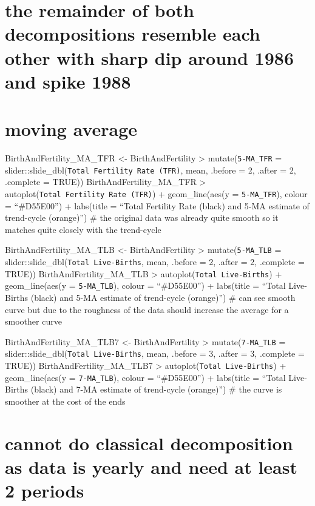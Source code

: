 \documentclass[
]{article}
\begin{document}
\section{the remainder of both decompositions resemble each other with
sharp dip around 1986 and spike
1988}\label{the-remainder-of-both-decompositions-resemble-each-other-with-sharp-dip-around-1986-and-spike-1988}

\section{moving average}\label{moving-average}

BirthAndFertility\_MA\_TFR \textless- BirthAndFertility
\textbar\textgreater{} mutate(\texttt{5-MA\_TFR} =
slider::slide\_dbl(\texttt{Total\ Fertility\ Rate\ (TFR)}, mean, .before
= 2, .after = 2, .complete = TRUE)) BirthAndFertility\_MA\_TFR
\textbar\textgreater{} autoplot(\texttt{Total\ Fertility\ Rate\ (TFR)})
+ geom\_line(aes(y = \texttt{5-MA\_TFR}), colour = ``\#D55E00'') +
labs(title = ``Total Fertility Rate (black) and 5-MA estimate of
trend-cycle (orange)'') \# the original data was already quite smooth so
it matches quite closely with the trend-cycle

BirthAndFertility\_MA\_TLB \textless- BirthAndFertility
\textbar\textgreater{} mutate(\texttt{5-MA\_TLB} =
slider::slide\_dbl(\texttt{Total\ Live-Births}, mean, .before = 2,
.after = 2, .complete = TRUE)) BirthAndFertility\_MA\_TLB
\textbar\textgreater{} autoplot(\texttt{Total\ Live-Births}) +
geom\_line(aes(y = \texttt{5-MA\_TLB}), colour = ``\#D55E00'') +
labs(title = ``Total Live-Births (black) and 5-MA estimate of
trend-cycle (orange)'') \# can see smooth curve but due to the roughness
of the data should increase the average for a smoother curve

BirthAndFertility\_MA\_TLB7 \textless- BirthAndFertility
\textbar\textgreater{} mutate(\texttt{7-MA\_TLB} =
slider::slide\_dbl(\texttt{Total\ Live-Births}, mean, .before = 3,
.after = 3, .complete = TRUE)) BirthAndFertility\_MA\_TLB7
\textbar\textgreater{} autoplot(\texttt{Total\ Live-Births}) +
geom\_line(aes(y = \texttt{7-MA\_TLB}), colour = ``\#D55E00'') +
labs(title = ``Total Live-Births (black) and 7-MA estimate of
trend-cycle (orange)'') \# the curve is smoother at the cost of the ends

\section{cannot do classical decomposition as data is yearly and need at
least 2
periods}\label{cannot-do-classical-decomposition-as-data-is-yearly-and-need-at-least-2-periods}
\end{document}
